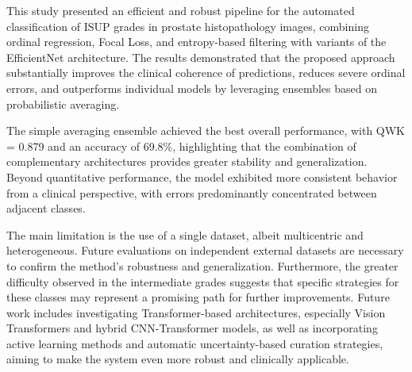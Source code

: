 This study presented an efficient and robust pipeline for the automated classification of ISUP grades in prostate histopathology images, combining ordinal regression, Focal Loss, and entropy-based filtering with variants of the EfficientNet architecture. The results demonstrated that the proposed approach substantially improves the clinical coherence of predictions, reduces severe ordinal errors, and outperforms individual models by leveraging ensembles based on probabilistic averaging.

The simple averaging ensemble achieved the best overall performance, with QWK = 0.879 and an accuracy of 69.8\%, highlighting that the combination of complementary architectures provides greater stability and generalization. Beyond quantitative performance, the model exhibited more consistent behavior from a clinical perspective, with errors predominantly concentrated between adjacent classes.

The main limitation is the use of a single dataset, albeit multicentric and heterogeneous. Future evaluations on independent external datasets are necessary to confirm the method's robustness and generalization. Furthermore, the greater difficulty observed in the intermediate grades suggests that specific strategies for these classes may represent a promising path for further improvements.
Future work includes investigating Transformer-based architectures, especially Vision Transformers and hybrid CNN-Transformer models, as well as incorporating active learning methods and automatic uncertainty-based curation strategies, aiming to make the system even more robust and clinically applicable.